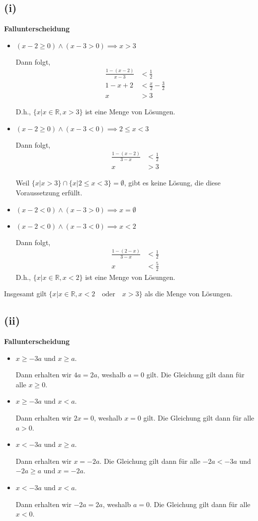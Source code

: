\documentclass[12pt]{extarticle}
\begin{document}
\subsection*{(i)}
\textbf{Fallunterscheidung}
\begin{itemize}
\item \((x-2 \geq 0) \wedge (x-3 > 0) \implies x > 3\)

  Dann folgt,
\begin{align*}
  \frac{1-(x-2)}{x-3} &< \frac{1}{2}\\
  1-x+2 &< \frac{x}{2} - \frac{3}{2}\\
  x &> 3
\end{align*}

D.h., \(\{x|x \in \mathbb{R}, x > 3\}\) ist eine Menge von Lösungen.
\item \((x-2 \geq 0) \wedge (x-3 < 0) \implies 2 \leq x < 3\)

  Dann folgt,
\begin{align*}
  \frac{1-(x-2)}{3-x} &< \frac{1}{2}\\
  x &> 3
\end{align*}

Weil \(\{x|x>3\} \cap \{x|2 \leq x < 3\} = \emptyset\), gibt es keine
Lösung, die diese Voraussetzung erfüllt.
\item \((x-2 < 0) \wedge (x-3 > 0) \implies x = \emptyset\)
\item \((x-2 < 0) \wedge (x-3 < 0) \implies x < 2\)

  Dann folgt,
\begin{align*}
  \frac{1-(2-x)}{3-x} &< \frac{1}{2}\\
  x &< \frac{5}{2}
\end{align*}
D.h., \(\{x|x \in \mathbb{R}, x < 2\}\) ist eine Menge von Lösungen.
\end{itemize}

Insgesamt gilt \(\{x|x \in \mathbb{R}, x < 2 \quad \text{oder} \quad x > 3\}\) als die
Menge von Lösungen.

\subsection*{(ii)}
\textbf{Fallunterscheidung}
\begin{itemize}
\item \(x \geq -3a\) und \(x \geq a\).

  Dann erhalten wir \(4a = 2a\), weshalb \(a=0\) gilt.  Die Gleichung gilt
  dann für alle \(x \geq 0\).
\item \(x \geq -3a\) und \(x < a\).

  Dann erhalten wir \(2x =0\), weshalb \(x=0\) gilt.  Die Gleichung gilt
  dann für alle \(a > 0\).
\item \(x < -3a\) und \(x \geq a\).

  Dann erhalten wir \(x=-2a\).  Die Gleichung gilt dann für alle $-2a <
  -3a$ und \(-2a \geq a\) und \(x = -2a\).
\item \(x < -3a\) und \(x < a\).

  Dann erhalten wir \(-2a=2a\), weshalb \(a=0\).  Die Gleichung gilt dann
  für alle \(x < 0\).
\end{itemize}
\end{document}
